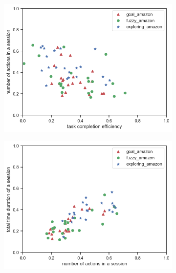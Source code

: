 \begin{figure}[H]
\begin{subfigure}[b]{0.45\textwidth}
        \caption{}
        \label{fig:2d-eff-dur-amazon}
    \end{subfigure}
    \begin{subfigure}[b]{0.45\textwidth}
        \includegraphics[width=1\textwidth]{figures/2d-eff-len-amazon}
        \caption{}
        \label{fig:2d-eff-len-amazon}
    \end{subfigure}
    \begin{subfigure}[b]{0.45\textwidth}
        \includegraphics[width=1\textwidth]{figures/2d-len-dur-amazon}
        \caption{}
        \label{fig:2d-len-dur-amazon}
    \end{subfigure}


\end{figure}
